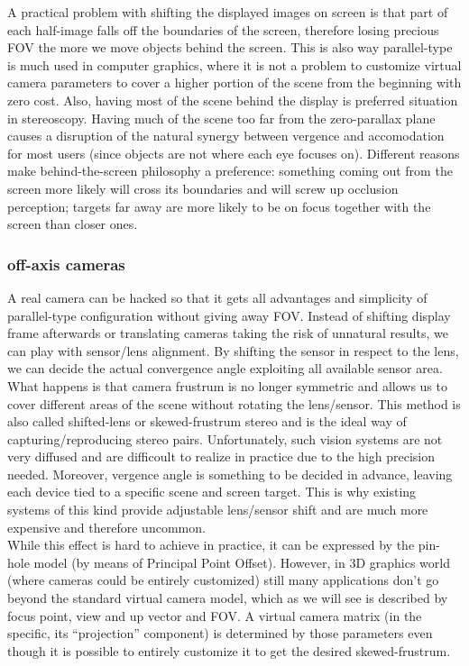 A practical problem with shifting the displayed images on screen is that part of each half-image falls off the boundaries of the screen, therefore losing precious FOV the more we move objects behind the screen. This is also way parallel-type is much used in computer graphics, where it is not a problem to customize virtual camera parameters to cover a higher portion of the scene from the beginning with zero cost. Also, having most of the scene behind the display is preferred situation in stereoscopy. Having much of the scene too far from the zero-parallax plane causes a disruption of the natural synergy between vergence and accomodation for most users (since objects are not where each eye focuses on). Different reasons make behind-the-screen philosophy a preference: something coming out from the screen more likely will cross its boundaries and will screw up occlusion perception; targets far away are more likely to be on focus together with the screen than closer ones.

\subsubsection{off-axis cameras}
A real camera can be hacked so that it gets all advantages and simplicity of parallel-type configuration without giving away FOV. Instead of shifting display frame afterwards or translating cameras taking the risk of unnatural results, we can play with sensor/lens alignment. By shifting the sensor in respect to the lens, we can decide the actual convergence angle exploiting all available sensor area. What happens is that camera frustrum is no longer symmetric and allows us to cover different areas of the scene without rotating the lens/sensor. This method is also called shifted-lens or skewed-frustrum stereo and is the ideal way of capturing/reproducing stereo pairs. Unfortunately, such vision systems are not very diffused and are difficoult to realize in practice due to the high precision needed. Moreover, vergence angle is something to be decided in advance, leaving each device tied to a specific scene and screen target. This is why existing systems of this kind provide adjustable lens/sensor shift and are much more expensive and therefore uncommon.\\
While this effect is hard to achieve in practice, it can be expressed by the pin-hole model (by means of Principal Point Offset). However, in 3D graphics world (where cameras could be entirely customized) still many applications don’t go beyond the standard virtual camera model, which as we will see is described by focus point, view and up vector and FOV. A virtual camera matrix (in the specific, its “projection” component) is determined by those parameters even though it is possible to entirely customize it to get the desired skewed-frustrum.

